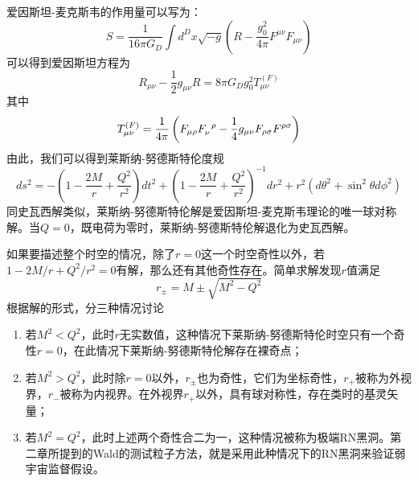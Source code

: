 爱因斯坦-麦克斯韦的作用量可以写为：
\begin{equation}
    S=\frac{1}{16 \pi G_D}\int d^D x \sqrt{-g}\left(R-\frac{g_{0}^2}{4 \pi}F^{\mu \nu}F_{\mu \nu}\right)
\end{equation}
可以得到爱因斯坦方程为
\begin{equation}
    R_{\mu \nu}-\frac{1}{2}g_{\mu \nu}R=8\pi G_D g_0^2 T^{\left(F\right)}_{\mu \nu}
\end{equation}
其中
\begin{equation}
    T^{\left(F\right)}_{\mu \nu}=\frac{1}{4\pi}\left(F_{\mu \rho }F\indices{_{\nu}^{\rho}}-\frac{1}{4}g_{\mu \nu}F_{\rho \sigma}F^{\rho \sigma} \right)
\end{equation}
由此，我们可以得到莱斯纳-努德斯特伦度规\citep{陈斌2018广义相对论}
\begin{equation}\label{eq: RNmetric}
     ds^2=-\left(1-\frac{2M}{r}+\frac{Q^2}{r^2}\right)dt^2+\left(1-\frac{2M}{r}+\frac{Q^2}{r^2}\right)^{-1}dr^2+r^2\left(d\theta^2+\sin ^2 \theta d\phi^2\right)
\end{equation}
同史瓦西解类似，莱斯纳-努德斯特伦解是爱因斯坦-麦克斯韦理论的唯一球对称解。当$Q=0$，既电荷为零时，莱斯纳-努德斯特伦解退化为史瓦西解。

如果要描述整个时空的情况，除了$r=0$这一个时空奇性以外，若$1-2M / r+Q^2 / r^2=0$有解，那么还有其他奇性存在。简单求解发现$r$值满足
\begin{equation}\label{eq: RNhorizon}
    r_{\pm}=M \pm \sqrt{M^2-Q^2}
\end{equation}
根据解的形式，分三种情况讨论
\begin{enumerate}
    \item 若$M^2<Q^2$，此时$r$无实数值，这种情况下莱斯纳-努德斯特伦时空只有一个奇性$r=0$，在此情况下莱斯纳-努德斯特伦解存在裸奇点；
    \item 若$M^2>Q^2$，此时除$r=0$以外，$r_{\pm}$也为奇性，它们为坐标奇性\citep{梁灿彬2006微分几何入门与广义相对论}，$r_+$被称为外视界，$r_-$被称为内视界。在外视界$r_+$以外，具有球对称性，存在类时的基灵矢量；
    \item 若$M^2=Q^2$，此时上述两个奇性合二为一，这种情况被称为极端RN黑洞。第二章所提到的Wald的测试粒子方法\citep{wald1974gedanken}，就是采用此种情况下的RN黑洞来验证弱宇宙监督假设。
\end{enumerate}
